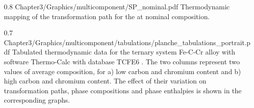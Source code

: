 \begin{figureth}
{0.8}
{Chapter3/Graphics/multicomponent/SP_nominal.pdf}
{Thermodynamic mapping \citep{tcfe6_tcfe6:_2010, andersson_thermo-calc_2002} of the transformation 
path for the  at nominal composition.}
\label{fig:ternary_nominalpath}
\end{figureth}


\begin{figureth}
{0.7}
{Chapter3/Graphics/multicomponent/tabulations/planche_tabulations_portrait.pdf}
{Tabulated thermodynamic data for the ternary system Fe-C-Cr alloy with software 
Thermo-Calc \citep{andersson_thermo-calc_2002}  with database TCFE6 \citep{tcfe6_tcfe6:_2010}.
The two columns represent two values of average composition, for a) low carbon and chromium content
and b) high carbon and chromium content.
The effect of their variation on transformation paths, phase compositions and phase enthalpies is shown in the corresponding graphs.}
\label{fig:ternary_tabulations}
\end{figureth}




